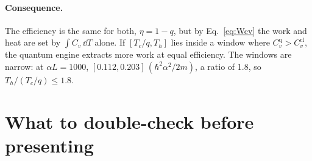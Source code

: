 \documentclass[11pt]{article}
\numberwithin{equation}{section}
\newcommand{\Cq}{C_v^{\mathrm{q}}}
\newcommand{\Ccl}{C_v^{\mathrm{cl}}}
\newcommand{\Eu}{\hbar^2\alpha^2/2m}
\begin{document}
\paragraph{Consequence.} The efficiency is the same for both, $\eta=1-q$, but by Eq.~\eqref{eq:Wcv} the work and heat are set by $\int C_v\,\dd T$ alone. If $[T_c/q,T_h]$ lies inside a window where $\Cq>\Ccl$, the quantum engine extracts more work at equal efficiency. The windows are narrow: at $\alpha L=1000$, $[0.112,0.203]\,(\Eu)$, a ratio of 1.8, so $T_h/(T_c/q)\le1.8$.

\section{What to double-check before presenting}
\label{sec:verify}
\end{document}

